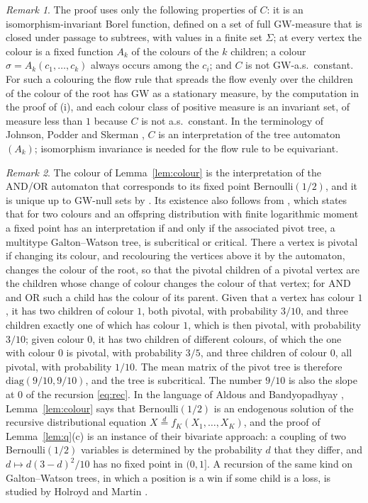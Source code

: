 \documentclass[11pt]{amsart}
\theoremstyle{remark}
\newtheorem{remark}{Remark}
\numberwithin{equation}{section}
\newcommand{\GW}{\mathrm{GW}}
\begin{document}
\begin{remark}\label{rem:general}
The proof uses only the following properties of $C$: it is an isomorphism-invariant Borel function, defined on a set of full $\GW$-measure that is closed under passage to subtrees, with values in a finite set $\Sigma$; at every vertex the colour is a fixed function $A_k$ of the colours of the $k$ children; a colour $\sigma=A_k(c_1,\dots,c_k)$ always occurs among the $c_i$; and $C$ is not $\GW$-a.s.\ constant. For such a colouring the flow rule that spreads the flow evenly over the children of the colour of the root has $\GW$ as a stationary measure, by the computation in the proof of (i), and each colour class of positive measure is an invariant set, of measure less than $1$ because $C$ is not a.s.\ constant. In the terminology of Johnson, Podder and Skerman \cite{JPS}, $C$ is an interpretation of the tree automaton $(A_k)$; isomorphism invariance is needed for the flow rule to be equivariant.
\end{remark}

\begin{remark}\label{rem:jps}
The colour of Lemma~\ref{lem:colour} is the interpretation of the AND/OR automaton that corresponds to its fixed point Bernoulli$(1/2)$, and it is unique up to $\GW$-null sets by \cite[Proposition~1.6]{JPS}. Its existence also follows from \cite[Theorem~1.7]{JPS}, which states that for two colours and an offspring distribution with finite logarithmic moment a fixed point has an interpretation if and only if the associated pivot tree, a multitype Galton--Watson tree, is subcritical or critical. There a vertex is pivotal if changing its colour, and recolouring the vertices above it by the automaton, changes the colour of the root, so that the pivotal children of a pivotal vertex are the children whose change of colour changes the colour of that vertex; for AND and OR such a child has the colour of its parent. Given that a vertex has colour $1$, it has two children of colour $1$, both pivotal, with probability $3/10$, and three children exactly one of which has colour $1$, which is then pivotal, with probability $3/10$; given colour $0$, it has two children of different colours, of which the one with colour $0$ is pivotal, with probability $3/5$, and three children of colour $0$, all pivotal, with probability $1/10$. The mean matrix of the pivot tree is therefore $\mathrm{diag}(9/10,9/10)$, and the tree is subcritical. The number $9/10$ is also the slope at $0$ of the recursion \eqref{eq:rec}. In the language of Aldous and Bandyopadhyay \cite{AB}, Lemma~\ref{lem:colour} says that Bernoulli$(1/2)$ is an endogenous solution of the recursive distributional equation $X\overset{d}{=}f_K(X_1,\dots,X_K)$, and the proof of Lemma~\ref{lem:q}(c) is an instance of their bivariate approach: a coupling of two Bernoulli$(1/2)$ variables is determined by the probability $d$ that they differ, and $d\mapsto d(3-d)^2/10$ has no fixed point in $(0,1]$. A recursion of the same kind on Galton--Watson trees, in which a position is a win if some child is a loss, is studied by Holroyd and Martin \cite{HM21}.
\end{remark}
\end{document}
